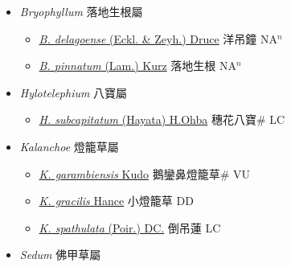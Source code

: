 
  \begin{itemize}
 \item[] \textit{Bryophyllum} 落地生根屬
                    
  \begin{itemize}
        \item[] \href{http://www.theplantlist.org/tpl1.1/search?q=Bryophyllum+delagoense}{\textit{B. delagoense} (Eckl. \& Zeyh.) Druce}   洋吊鐘 NA$^n$
        \item[] \href{http://www.theplantlist.org/tpl1.1/search?q=Bryophyllum+pinnatum}{\textit{B. pinnatum} (Lam.) Kurz}   落地生根 NA$^n$
  \end{itemize}
 \item[] \textit{Hylotelephium} 八寶屬
                    
  \begin{itemize}
        \item[] \href{http://www.theplantlist.org/tpl1.1/search?q=Hylotelephium+subcapitatum}{\textit{H. subcapitatum} (Hayata) H.Ohba}   穗花八寶\# LC
  \end{itemize}
 \item[] \textit{Kalanchoe} 燈籠草屬
                    
  \begin{itemize}
        \item[] \href{http://www.theplantlist.org/tpl1.1/search?q=Kalanchoe+garambiensis}{\textit{K. garambiensis} Kudo}   鵝鑾鼻燈籠草\# VU
        \item[] \href{http://www.theplantlist.org/tpl1.1/search?q=Kalanchoe+gracilis}{\textit{K. gracilis} Hance}   小燈籠草 DD
        \item[] \href{http://www.theplantlist.org/tpl1.1/search?q=Kalanchoe+spathulata}{\textit{K. spathulata} (Poir.) DC.}   倒吊蓮 LC
  \end{itemize}
 \item[] \textit{Sedum} 佛甲草屬
                    

\end{itemize}
